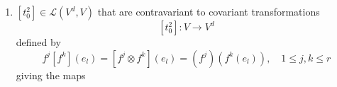 \documentclass[aps,preprint]{revtex4}
\begin{document}
\begin{enumerate}
\begin{enumerate}
\begin{gather}
\begin{array}{c}
\mathcal{R}_{f_{b}f_{b}}\left( t_{0}^{2}\right) _{jk} \\ 
\vdots \\ 
\mathcal{R}_{f_{b}f_{b}}\left( t_{0}^{2}\right) _{rr}%
\end{array}%
\right) ,
\end{gather}%
where 
\begin{equation}
\left( 
\begin{array}{c}
\mathcal{R}_{f_{b}f_{b}}\left( t_{0}^{2}\right) _{11} \\ 
\vdots \\ 
\mathcal{R}_{f_{b}f_{b}}\left( t_{0}^{2}\right) _{jk} \\ 
\vdots \\ 
\mathcal{R}_{f_{b}f_{b}}\left( t_{0}^{2}\right) _{rr}%
\end{array}%
\right) =\left( 
\begin{array}{c}
\left( \overset{}{f_{bb1}\otimes f_{bb1}}\right) \left( \overset{}{t_{0}^{2}}%
\right) \\ 
\vdots \\ 
\left( \overset{}{f_{bbj}\otimes f_{bbk}}\right) \left( \overset{}{t_{0}^{2}}%
\right) \\ 
\vdots \\ 
\left( \overset{}{f_{bbr}\otimes f_{bbr}}\right) \left( \overset{}{t_{0}^{2}}%
\right)%
\end{array}%
\right) =\left( 
\begin{array}{c}
t_{0}^{2}\left( f_{1}\otimes f_{1}\right) \\ 
\vdots \\ 
t_{0}^{2}\left( f_{j}\otimes f_{k}\right) \\ 
\vdots \\ 
t_{0}^{2}\left( f_{r}\otimes f_{r}\right)%
\end{array}%
\right) .
\end{equation}%
This produces maps

\item $\left[ t_{0}^{2}\right] \in \mathcal{L}\left( V^{d},V\right) $ that
are contravariant to covariant transformations 
\begin{equation}
\left[ t_{0}^{2}\right] :V\rightarrow V^{d}
\end{equation}%
defined by%
\begin{equation}
f^{j}\left[ f^{k}\right] \left( e_{l}\right) =\left[ f^{j}\otimes f^{k}%
\right] \left( e_{l}\right) =\left( f^{j}\right) \left( f^{k}\left(
e_{l}\right) \right) ,\quad 1\leq j,k\leq r
\end{equation}%
giving the maps


\end{enumerate}
\end{enumerate}
\end{document}
